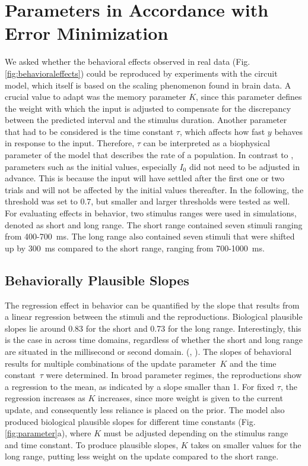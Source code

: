 \documentclass[10pt]{article}
\begin{document}
\section{Parameters in Accordance with Error Minimization}
We asked whether the behavioral effects observed in real data (Fig. \ref{fig:behavioraleffects}) could be reproduced by experiments with the circuit model, which itself is based on the scaling phenomenon found in brain data. 
A crucial value to adapt was the memory parameter $K$, since this parameter defines the weight with which the input is adjusted to compensate for the discrepancy between the predicted interval and the stimulus duration.
Another parameter that had to be considered is the time constant $\tau$, which affects how fast $y$ behaves in response to the input. Therefore, $\tau$ can be interpreted as a biophysical parameter of the model that describes the rate of a population.
In contrast to \cite{Egger2019}, parameters such as the initial values, especially $I_0$ did not need to be adjusted in advance. This is because the input will have settled after the first one or two trials and will not be affected by the initial values thereafter.
In the following, the threshold was set to 0.7, but smaller and larger thresholds were tested as well.
For evaluating effects in behavior, two stimulus ranges were used in simulations, denoted as short and long range. The short range contained seven stimuli ranging from 400-700~ms. The long range also contained seven stimuli that were shifted up by 300~ms compared to the short range, ranging from 700-1000~ms.

 
\subsection{Behaviorally Plausible Slopes}
The regression effect in behavior can be quantified by the slope that results from a linear regression between the stimuli and the reproductions.
Biological plausible slopes lie around 0.83 for the short and 0.73 for the long range.
Interestingly, this is the case in across time domains, regardless of whether the short and long range are situated in the millisecond or second domain. (\cite{Thurley2018}, \cite{Jazayeri2010}). 
The slopes of behavioral results for multiple combinations of the update parameter~$K$ and the time constant~$\tau$ were determined. 
In broad parameter regimes, the reproductions show a regression to the mean, as indicated by a slope smaller than 1. 
For fixed $\tau$, the regression increases as $K$ increases, since more weight is given to the current update, and consequently less reliance is placed on the prior. 
The model also produced biological plausible slopes for different time constants (Fig. \ref{fig:parameter}a), where $K$ must be adjusted depending on the stimulus range and time constant. 
To produce plausible slopes, $K$ takes on smaller values for the long range, putting less weight on the update compared to the short range.
\end{document}

